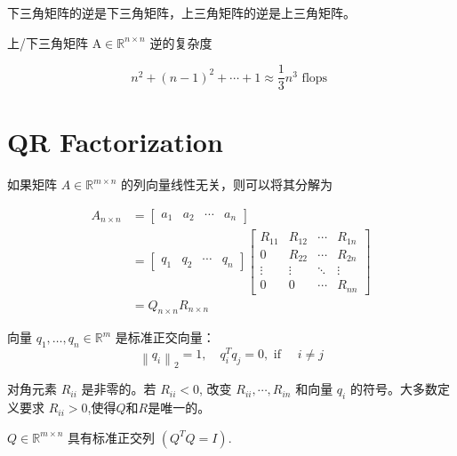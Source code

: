 \begin{theorem}
    下三角矩阵的逆是下三角矩阵，上三角矩阵的逆是上三角矩阵。
\end{theorem}

上/下三角矩阵 $ \mathrm{A} \in \mathbb{R}^{n \times n} $ 逆的复杂度

$$ n^{2}+(n-1)^{2}+\cdots+1 \approx \frac{1}{3} n^{3}\text{ flops }$$ 

\section{QR Factorization}

如果矩阵 $ A \in \mathbb{R}^{m \times n} $ 的列向量线性无关，则可以将其分解为

\begin{theorem}[QR Factorization]
    
    $$\begin{aligned} A_{n  \times n}&=\left[\begin{array}{llll}a_{1} & a_{2} & \cdots & a_{n}\end{array}\right]\\
        &=\left[\begin{array}{llll}q_{1} & q_{2} & \cdots & q_{n}\end{array}\right]\left[\begin{array}{cccc}R_{11} & R_{12} & \cdots & R_{1 n} \\ 0 & R_{22} & \cdots & R_{2 n} \\ \vdots & \vdots & \ddots & \vdots \\ 0 & 0 & \cdots & R_{n n}\end{array}\right]\\
        &=Q_{n  \times n}R_{n  \times  n}
        \end{aligned}$$

向量 $ q_{1}, \ldots, q_{n} \in \mathbb{R}^{m} $ 是标准正交向量：
$$
\left\|q_{i}\right\|_{2}=1, \quad q_{i}^{T} q_{j}=0, \text { if } \quad i \neq j
$$

对角元素 $ R_{i i} $ 是非零的。若 $ R_{i i}<0 $, 改变 $ R_{i i}, \cdots, R_{i n} $ 和向量 $ q_{i} $ 的符号。大多数定义要求 $ R_{i i}>0 $,使得$Q$和$R$是唯一的。
\end{theorem}



\begin{corollary}
    $ Q \in \mathbb{R}^{m \times n} $ 具有标准正交列 $ \left(Q^{T} Q=I\right) $.
\end{corollary}

